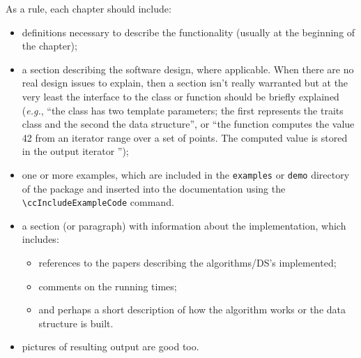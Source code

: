 As a rule, each chapter should include:
\begin{itemize}
 \item definitions necessary to describe the functionality (usually at the
       beginning of the chapter);

 \item a section describing the software design, where applicable.  When there
       are no real design issues to explain, then a section isn't really 
       warranted but at the very least the interface to the class or function 
       should be briefly explained (\textit{e.g.}, ``the class 
        has two template parameters; the first 
       represents the traits class and the second the data structure'', or 
       ``the function  computes the value 42 
        from an iterator range \ccc{[b, e)} over a set of points.  The 
        computed value is stored in the output iterator '');

  \item one or more examples, which are included in the \texttt{examples}
        or \texttt{demo} directory of the package and inserted into the
        documentation using the \verb|\ccIncludeExampleCode| command.

  \item a section (or paragraph) with information about the 
        implementation, which includes: 
        \begin{itemize}
          \item references to the papers describing the algorithms/DS's 
                implemented; 
          \item comments on the running times; 
          \item and perhaps a short description of how the algorithm works or 
                the data structure is built.
        \end{itemize}

  \item pictures of resulting output are good too.
\end{itemize}

